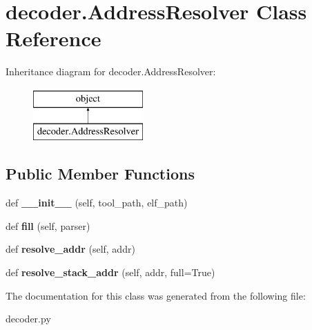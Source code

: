 \hypertarget{classdecoder_1_1_address_resolver}{}\section{decoder.\+Address\+Resolver Class Reference}
\label{classdecoder_1_1_address_resolver}
Inheritance diagram for decoder.\+Address\+Resolver\+:\begin{figure}[H]
\begin{center}
\leavevmode
\includegraphics[height=2.000000cm]{classdecoder_1_1_address_resolver}
\end{center}
\end{figure}
\subsection*{Public Member Functions}
\begin{DoxyCompactItemize}
\item 
\mbox{\label{classdecoder_1_1_address_resolver_aaa08c338ad41c1ec13c48b9ae51a126f}} 
def {\bfseries \+\_\+\+\_\+init\+\_\+\+\_\+} (self, tool\+\_\+path, elf\+\_\+path)
\item 
\mbox{\label{classdecoder_1_1_address_resolver_ae382ca48db4965c4680cd76eb4728d22}} 
def {\bfseries fill} (self, parser)
\item 
\mbox{\label{classdecoder_1_1_address_resolver_a6ae592b4e505b643b2491b625ba20888}} 
def {\bfseries resolve\+\_\+addr} (self, addr)
\item 
\mbox{\label{classdecoder_1_1_address_resolver_a5177da2dda257e5d092166c82e9fc41c}} 
def {\bfseries resolve\+\_\+stack\+\_\+addr} (self, addr, full=True)
\end{DoxyCompactItemize}


The documentation for this class was generated from the following file\+:\begin{DoxyCompactItemize}
\item 
decoder.\+py\end{DoxyCompactItemize}
